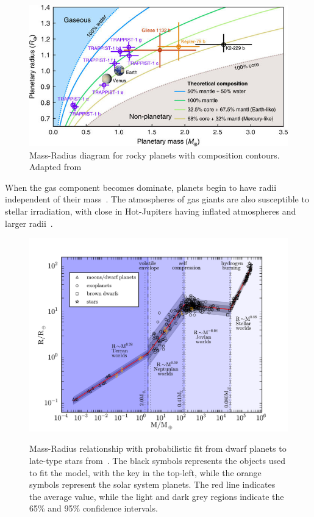 \begin{figure}
    \centering
    \includegraphics[width=0.7\linewidth]{figures/introduction/santerne_2018}
    \caption[Mass-Radius diagram for rocky planets with composition contours.]{Mass-Radius diagram for rocky planets with composition contours.
        Adapted from~\citet{santerne_earthsized_2018}}
    \label{fig:santerne2018}
\end{figure}

When the gas component becomes dominate, planets begin to have radii independent of their mass~\citep[e.g.][]{lopez_understanding_2014}.
The atmospheres of gas giants are also susceptible to stellar irradiation, with close in Hot-Jupiters having inflated atmospheres and larger radii~\citep[e.g][]{fortney_interior_2010}.

\begin{figure}
    \centering
    \includegraphics[width=0.7\linewidth]{./figures/introduction/mass_radius_relation.pdf}  \\
    \caption[Mass-Radius relationship with probabilistic fit.]{Mass-Radius relationship with probabilistic fit from dwarf planets to late-type stars from~\citet{chen_probabilistic_2016}.
    The black symbols represents the objects used to fit the model, with the key in the top-left, while the orange symbols represent the solar system planets.
    The red line indicates the average value, while the light and dark grey regions indicate the 65\% and 95\% confidence intervals.}
    \label{fig:mass_radius_relation}
\end{figure}

